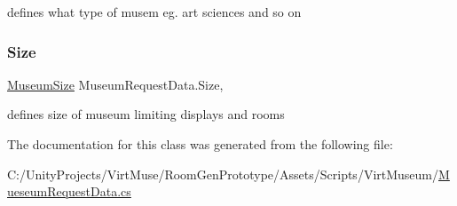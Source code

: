 defines what type of musem eg. art sciences and so on 

\mbox{\label{class_museum_request_data_a8c9489791297c88de3c37c0fe340858d}} 
\subsubsection{\texorpdfstring{Size}{Size}}
{\footnotesize\ttfamily \mbox{\hyperlink{_mueseum_request_data_8cs_a462fa84e99cf703318040e54f14146a2}{Museum\+Size}} Museum\+Request\+Data.\+Size\hspace{0.3cm}{\ttfamily [get]}, {\ttfamily [set]}}



defines size of museum limiting displays and rooms 



The documentation for this class was generated from the following file\+:\begin{DoxyCompactItemize}
\item 
C\+:/\+Unity\+Projects/\+Virt\+Muse/\+Room\+Gen\+Prototype/\+Assets/\+Scripts/\+Virt\+Museum/\mbox{\hyperlink{_mueseum_request_data_8cs}{Mueseum\+Request\+Data.\+cs}}\end{DoxyCompactItemize}
